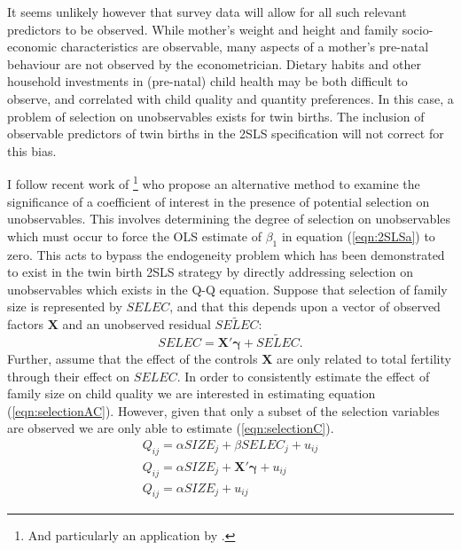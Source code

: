 \documentclass{article}[11pt,subeqn]
\newcommand{\vect}[1]{\mathbf{#1}}
\begin{document}
\begin{spacing}{1.25}
It seems unlikely however that survey data will allow for all such relevant predictors to be observed.  While mother's weight and height and family socio-economic characteristics 
are observable, many aspects of a mother's pre-natal behaviour are not observed by the econometrician.  Dietary habits and other household investments in (pre-natal) child health 
may be both difficult to observe, and correlated with child quality and quantity preferences.  In this case, a problem of selection on unobservables exists for twin births.  The 
inclusion of observable predictors of twin births in the 2SLS specification will not correct for this bias.

I follow recent work of \citet{Altonjietal2005, Altonjietal2008}\footnote{And particularly an application by \citet{BellowsMiguel2008}.} who propose an alternative method to examine the 
significance of a coefficient of interest in the presence of 
potential selection on unobservables.  This involves determining the degree of selection on unobservables which must occur to force the OLS estimate of $\beta_1$ in equation 
(\ref{eqn:2SLSa}) to zero.  This acts to bypass the endogeneity problem which has been demonstrated to exist in the twin birth 2SLS strategy by directly addressing selection on 
unobservables which exists in the Q-Q equation. Suppose that selection of family size is represented by $SELEC$, and that this depends upon a vector of observed factors $\vect{X}$
and an unobserved residual $\widetilde{SELEC}$:  %
\begin{equation}
SELEC=\vect{X'\gamma}+ \widetilde{SELEC}.
\end{equation}
Further, assume that the effect of the controls $\vect{X}$ are only related to total fertility through their effect on $SELEC$.   In order to consistently estimate the effect of 
family size on child quality we are interested in estimating equation 
(\ref{eqn:selectionAC}).  However, given that only a subset of the selection variables are observed we are only able to estimate (\ref{eqn:selectionC}).
\begin{subequations}
\label{eqn:selection}
\begin{eqnarray}
Q_{ij}=\alpha SIZE_{j}+\beta SELEC_j+u_{ij} \label{eqn:selectionAC}\\
Q_{ij}=\alpha SIZE_{j}+\vect{X'\gamma}+u_{ij} \label{eqn:selectionC}\\
Q_{ij}=\alpha SIZE_{j}+u_{ij} \label{eqn:selectionNC}

\end{eqnarray}
\end{subequations}
\end{spacing}
\end{document}
